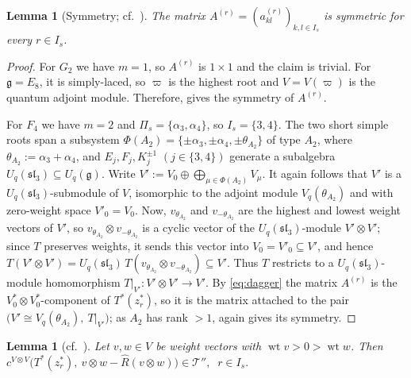 \documentclass[12pt]{amsart}
\theoremstyle{plain}
\newtheorem{lemma}[theorem]{Lemma}
\theoremstyle{remark}
\newcommand{\g}{\mathfrak{g}}
\newcommand{\Uq}{U_q(\g)}
\newcommand{\wt}{\operatorname{wt}}
\newcommand{\ot}{\otimes}
\newcommand{\vp}{\varpi}
\newcommand{\Rhat}{\widehat{R}}
\newcommand{\Pis}{\Pi_{s}}
\begin{document}
\begin{lemma}[Symmetry; {\rm cf.}\ {\rm\cite[Lemma~5.11]{OQY}}]\label{lem:sym}
The matrix $A^{(r)}=(a^{(r)}_{kl})_{k,l\in I_s}$ is symmetric for every $r\in I_s$.
\end{lemma}

\begin{proof}
For $G_2$ we have $m=1$, so $A^{(r)}$ is $1\times1$ and the claim is trivial. For $\g=E_8$, it is simply-laced, so $\vp$ is the highest root and $V=V(\vp)$
is the quantum adjoint module. Therefore, \cite[Lemma~5.11]{OQY} gives the symmetry of $A^{(r)}$.

For $F_4$ we have $m=2$ and $\Pis=\{\alpha_3,\alpha_4\}$, so $I_s=\{3,4\}$. The two
short simple roots span a subsystem $\Phi(A_2)=\{\pm\alpha_3,\pm\alpha_4,
\pm\theta_{A_2}\}$ of type $A_2$, where $\theta_{A_2}:=\alpha_3+\alpha_4$, and
$E_j,F_j,K_j^{\pm1}$ $(j\in\{3,4\})$ generate a subalgebra
$U_q(\mathfrak{sl}_3)\subseteq\Uq$. Write $V':=V_0\oplus\bigoplus_{\mu\in\Phi(A_2)}V_\mu$. It again follows that $V'$
is a $U_q(\mathfrak{sl}_3)$-submodule of $V$, isomorphic to the adjoint module
$V_q(\theta_{A_2})$ and with zero-weight space $V'_0=V_0$. Now, $v_{\theta_{A_2}}$ and $v_{-\theta_{A_2}}$ are the highest and  lowest weight vectors
of $V'$, so $v_{\theta_{A_2}}\ot v_{-\theta_{A_2}}$ is a cyclic vector of the
$U_q(\mathfrak{sl}_3)$-module $V'\ot V'$; since $T$ preserves weights, it sends this
vector into $V_0= V'_0\subseteq V'$, and hence
$T(V'\ot V')=U_q(\mathfrak{sl}_3)\,T(v_{\theta_{A_2}}\ot v_{-\theta_{A_2}})\subseteq V'$. Thus $T$ restricts to a $U_q(\mathfrak{sl}_3)$-module homomorphism
$T|_{V'}\colon V'\ot V'\to V'$. By \eqref{eq:dagger} the matrix $A^{(r)}$ is the
$V_0^*\ot V_0^*$-component of $T^*(z_r^*)$, so it is the matrix attached to the pair
$\big(V'\cong V_q(\theta_{A_2}),\ T|_{V'}\big)$; as $A_2$ has rank $>1$,
\cite[Lemma~5.11]{OQY} again gives its symmetry.
\end{proof}

\begin{lemma}[{\rm cf.}\ {\rm\cite[Theorem~5.9]{OQY}}]\label{lem:key}
Let $v,w\in V$ be weight vectors with $\wt v>0>\wt w$. Then 
$c^{V\ot V}\big(T^*(z_r^*),\ v\ot w-\Rhat(v\ot w)\big)\in\mathscr{T}'',
\;\; r\in I_s.$
\end{lemma}
\end{document}
